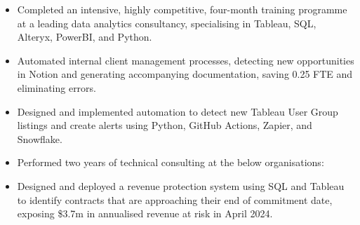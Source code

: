 \documentclass[10pt,a4paper,ragged2e,withhyper]{altacv}
\begin{document}

\makecvname



\begin{paracol}{2}

\begin{itemize}
\item Completed an intensive, highly competitive, four-month training programme at a leading data analytics consultancy, specialising in Tableau, SQL, Alteryx, PowerBI, and Python.
\item Automated internal client management processes, detecting new opportunities in Notion and generating accompanying documentation, saving 0.25 FTE and eliminating errors.
\item Designed and implemented automation to detect new Tableau User Group listings and create alerts using Python, GitHub Actions, Zapier, and Snowflake.
\item Performed two years of technical consulting at the below organisations:

\medskip
{}

\end{itemize}

\divider

\begin{itemize}
\item Designed and deployed a revenue protection system using SQL and Tableau to identify contracts that are approaching their end of commitment date, exposing \$3.7m in annualised revenue at risk in April 2024.


\end{itemize}
\end{paracol}
\end{document}
